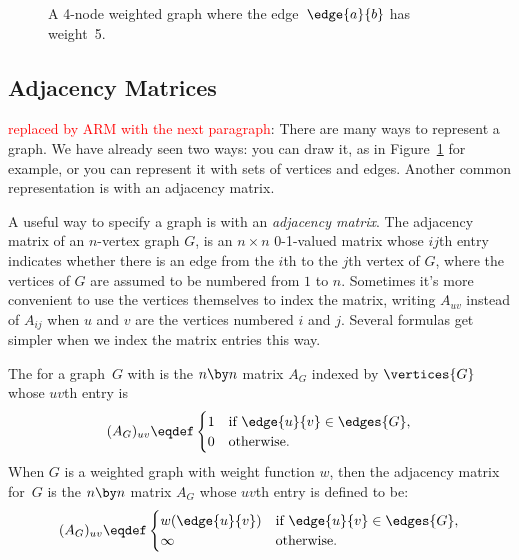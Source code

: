 \begin{editingnotes}
\begin{figure}


\caption{A 4-node weighted graph where the edge~$\edge{a}{b}$ has
  weight~5.}
\label{fig:weighted_graph}
\end{figure}

\subsection{Adjacency Matrices}

  \textcolor{red}{replaced by ARM with the next paragraph}: There are many
  ways to represent a graph.  We have already seen two ways: you can draw
  it, as in Figure~\ref{fig:weighted_graph} for example, or you can
  represent it with sets of vertices and edges.  Another common
  representation is with an adjacency matrix.

A useful way to specify a graph is with an \emph{adjacency matrix}.  The
adjacency matrix of an $n$-vertex graph $G$, is an $n \times n$ 0-1-valued
matrix whose $ij$th entry indicates whether there is an edge from the
$i$th to the $j$th vertex of $G$, where the vertices of $G$ are assumed to
be numbered from $1$ to $n$.  Sometimes it's more convenient to use the
vertices themselves to index the matrix, writing $A_{uv}$ instead of
$A_{ij}$ when $u$ and $v$ are the vertices numbered $i$ and $j$.  Several
formulas get simpler when we index the matrix entries this way.

\begin{definition}\label{def:adjacency_matrix}
The  for a graph~$G$ with
is the $n \by n$ matrix $A_G$  indexed by $\vertices{G}$ whose $uv$th entry is
\begin{equation*}
    (A_G)_{uv} \eqdef \begin{cases}
                1 & \text{if $\edge{u}{v} \in \edges{G}$}, \\
                0 & \text{otherwise.}
              \end{cases}
\end{equation*}
When $G$ is a weighted graph with weight function $w$, then the adjacency
matrix for~$G$ is the $n \by n$ matrix $A_G$ whose $uv$th entry is defined
to be:
\begin{equation*}
      (A_G)_{uv} \eqdef \begin{cases}
                w(\edge{u}{v}) & \text{if $\edge{u}{v} \in \edges{G}$}, \\
                \infty         & \text{otherwise.}
              \end{cases}
\end{equation*}
\end{definition}


\end{editingnotes}
